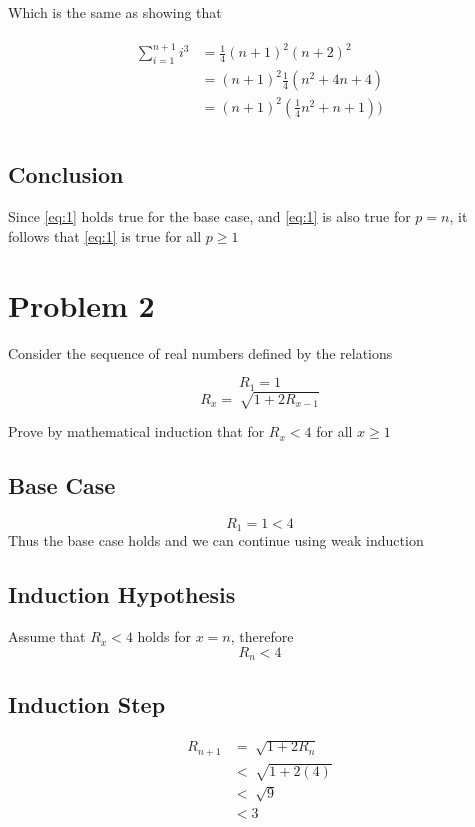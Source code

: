 \documentclass[paper=a4, fontsize=11pt]{scrartcl} %
\numberwithin{equation}{section} %
\numberwithin{figure}{section} %
\numberwithin{table}{section} %
\begin{document}
Which is the same as showing that

\begin{align} 
\begin{split}
\sum_{i=1}^{n+1} i^3 	&= \frac{1}{4}(n+1)^2(n+2)^2\\
&= (n+1)^2\frac{1}{4}(n^2+4n+4) \\
&=(n+1)^2(\frac{1}{4}n^2+n+1))\\
\end{split}	
\end{align}
\subsection{Conclusion}

Since \ref{eq:1} holds true for the base case, and \ref{eq:1} is also true for $p=n$, it follows that \eqref{eq:1} is true for all $p\geq1$

\section{Problem 2}
Consider the sequence of real numbers defined by the relations

\begin{equation}
R_1 = 1 
\end{equation}
\begin{equation}
R_x = \sqrt[]{1 + 2R_{x-1}} \tag*{for all $x > 1$}
\end{equation}

Prove by mathematical induction that for $R_x<4$ for all $x\geq1$ 
\subsection{Base Case}
\begin{equation}
R_1 = 1 < 4
\end{equation}
Thus the base case holds and we can continue using weak induction
\subsection{Induction Hypothesis}
Assume that $R_x < 4$ holds for $x = n$, therefore
\begin{equation}
R_n < 4
\end{equation}
\subsection{Induction Step}
\begin{align} 
R_{n+1} 	&= \sqrt[]{1 + 2R_{n}} \tag*{}\\
			&< \sqrt[]{1 + 2(4)} \tag*{By Induction Hypothesis} \\
			&< \sqrt[]{9}\tag*{} \\
			&< 3\tag*{} \\
\end{align}
\end{document}
